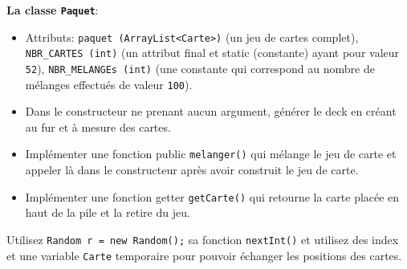 \begin{Exercice}[15 minutes]
\textbf{La classe \lstinline{Paquet}}:
\begin{itemize}
    \item Attributs: \lstinline{paquet (ArrayList<Carte>)} (un jeu de cartes complet), \lstinline{NBR_CARTES (int)} (un attribut final et static (constante) ayant pour valeur \lstinline{52}), \lstinline{NBR_MELANGEs (int)} (une constante qui correspond au nombre de mélanges effectués de valeur \lstinline{100}).
    \item Dans le constructeur ne prenant aucun argument, générer le deck en créant au fur et à mesure des cartes. 
    \item Implémenter une fonction public \lstinline{melanger()} qui mélange le jeu de carte et appeler là dans le constructeur après avoir construit le jeu de carte.
    \item Implémenter une fonction getter \lstinline{getCarte()} qui retourne la carte placée en haut de la pile et la retire du jeu.
\end{itemize}
\begin{conseil}
Utilisez \lstinline{Random r = new Random();} sa fonction \lstinline{nextInt()} et utilisez des index et une variable \lstinline{Carte} temporaire pour pouvoir échanger les positions des cartes.
\end{conseil}




\begin{solution}

\end{solution}
\begin{solution}

\end{solution}
\begin{solution}

\end{solution}
\end{Exercice}

